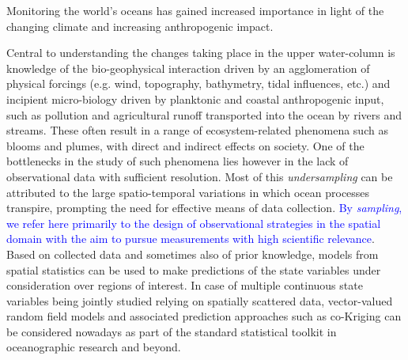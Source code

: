 \documentclass[aoas]{imsart}
\begin{document}
Monitoring the world's oceans has gained increased importance in light of the changing climate and increasing anthropogenic impact. 

Central to understanding the changes taking place in the upper
water-column is knowledge of the bio-geophysical interaction driven by
an agglomeration of physical forcings (e.g. wind, topography,
bathymetry, tidal influences, etc.) and incipient micro-biology driven
by planktonic and coastal anthropogenic input, such as pollution and
agricultural runoff transported into the ocean by rivers and streams.
These often result in a range of ecosystem-related phenomena such as
blooms and plumes, with direct and indirect effects on society. 
 One of the bottlenecks in the study of such phenomena lies however in the lack of observational data with sufficient resolution. Most of this \emph{undersampling} can be attributed to the large spatio-temporal variations in which ocean processes transpire, prompting the need for effective means of data collection. 
%
 \textcolor{blue}{By \emph{sampling}, we refer here primarily to the design of observational strategies in the spatial domain %
 with the aim to pursue measurements with high scientific relevance}.
Based on collected data and sometimes also of prior knowledge, models from spatial statistics can be used to make predictions of the state variables under consideration over regions of interest. In case of multiple continuous state variables being jointly studied relying on spatially scattered data, vector-valued random field models and associated prediction approaches such as co-Kriging \citep[See, e.g.,][]{Wackernagel2003} can be considered nowadays as part of the standard statistical toolkit in oceanographic research and beyond. %
  
\end{document}
